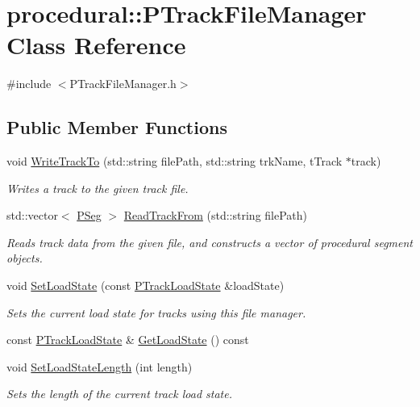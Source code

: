 \hypertarget{classprocedural_1_1_p_track_file_manager}{\section{procedural\-:\-:P\-Track\-File\-Manager Class Reference}
\label{classprocedural_1_1_p_track_file_manager}
}


{\ttfamily \#include $<$P\-Track\-File\-Manager.\-h$>$}

\subsection*{Public Member Functions}
\begin{DoxyCompactItemize}
\item 
void \hyperlink{classprocedural_1_1_p_track_file_manager_ae2f2f4487884fe23d36474d60dd7a506}{Write\-Track\-To} (std\-::string file\-Path, std\-::string trk\-Name, t\-Track $\ast$track)
\begin{DoxyCompactList}\small\item\em Writes a track to the given track file. \end{DoxyCompactList}\item 
std\-::vector$<$ \hyperlink{classprocedural_1_1_p_seg}{P\-Seg} $>$ \hyperlink{classprocedural_1_1_p_track_file_manager_a9bd3c31fc9a8ea0276d0d5f47dff104f}{Read\-Track\-From} (std\-::string file\-Path)
\begin{DoxyCompactList}\small\item\em Reads track data from the given file, and constructs a vector of procedural segment objects. \end{DoxyCompactList}\item 
void \hyperlink{classprocedural_1_1_p_track_file_manager_acddbcfe9df4c62579dfee164cb3099f3}{Set\-Load\-State} (const \hyperlink{classprocedural_1_1_p_track_load_state}{P\-Track\-Load\-State} \&load\-State)
\begin{DoxyCompactList}\small\item\em Sets the current load state for tracks using this file manager. \end{DoxyCompactList}\item 
const \hyperlink{classprocedural_1_1_p_track_load_state}{P\-Track\-Load\-State} \& \hyperlink{classprocedural_1_1_p_track_file_manager_a8b50973554585324d2e9fccb42d0e506}{Get\-Load\-State} () const 
\item 
void \hyperlink{classprocedural_1_1_p_track_file_manager_a253c64bb76a9ac6a51613d0dc4ba2d12}{Set\-Load\-State\-Length} (int length)
\begin{DoxyCompactList}\small\item\em Sets the length of the current track load state. \end{DoxyCompactList}\end{DoxyCompactItemize}
